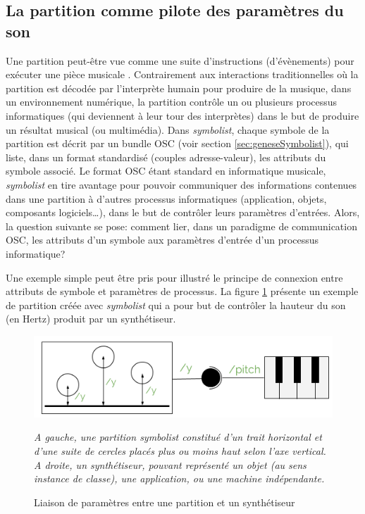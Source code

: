 \subsection{La partition comme pilote des paramètres du son} 
\label{subsec:partitionPiloteSon}
Une partition peut-être vue comme une suite d'instructions (d'évènements) pour exécuter une pièce musicale \cite{bosseur2005}. Contrairement aux interactions traditionnelles où la partition est décodée par l'interprète humain pour produire de la musique, dans un environnement numérique, la partition contrôle un ou plusieurs processus informatiques (qui deviennent à leur tour des interprètes) dans le but de produire un résultat musical (ou multimédia).
Dans \textit{symbolist}, chaque symbole de la partition est décrit par un bundle OSC (voir section \ref{sec:geneseSymbolist}), qui liste, dans un format standardisé (couples adresse-valeur), les attributs du symbole associé.
Le format OSC étant standard en informatique musicale, \textit{symbolist} en tire avantage pour pouvoir communiquer des informations contenues dans une partition à d'autres processus informatiques (application, objets, composants logiciels…), dans le but de contrôler leurs paramètres d'entrées.
Alors, la question suivante se pose: comment lier, dans un paradigme de communication OSC, les attributs d'un symbole aux paramètres d'entrée d'un processus informatique?

Une exemple simple peut être pris pour illustré le principe de connexion entre attributs de symbole et paramètres de processus. La figure \ref{fig:linkingParameters} présente un exemple de partition créée avec \textit{symbolist} qui a pour but de contrôler la hauteur du son (en Hertz) produit par un synthétiseur.

\begin{figure}[H]
	\centering
	\includegraphics[keepaspectratio=true, width=\textwidth]{ModeleDeNotation/i/linkingParameters.png}
	\caption{Liaison de paramètres entre une partition et un synthétiseur}
	\label{fig:linkingParameters}
	\small
	\textit{ A gauche, une partition \textit{symbolist} constitué d'un trait horizontal et d'une suite de cercles placés plus ou moins haut selon l'axe vertical. A droite, un synthétiseur, pouvant représenté un objet (au sens instance de classe), une application, ou une machine indépendante. }
\end{figure}


